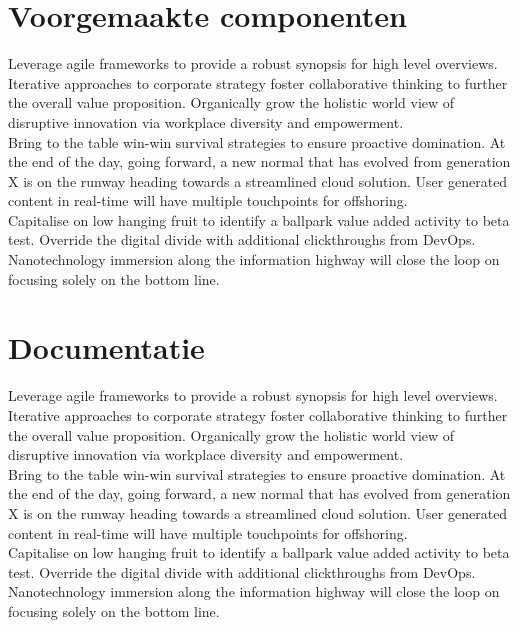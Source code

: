 \section{Voorgemaakte componenten}
Leverage agile frameworks to provide a robust synopsis for high level overviews. Iterative approaches to corporate strategy foster collaborative thinking to further the overall value proposition. Organically grow the holistic world view of disruptive innovation via workplace diversity and empowerment.\\

Bring to the table win-win survival strategies to ensure proactive domination. At the end of the day, going forward, a new normal that has evolved from generation X is on the runway heading towards a streamlined cloud solution. User generated content in real-time will have multiple touchpoints for offshoring. \\

Capitalise on low hanging fruit to identify a ballpark value added activity to beta test. Override the digital divide with additional clickthroughs from DevOps. Nanotechnology immersion along the information highway will close the loop on focusing solely on the bottom line. 

\section{Documentatie}
Leverage agile frameworks to provide a robust synopsis for high level overviews. Iterative approaches to corporate strategy foster collaborative thinking to further the overall value proposition. Organically grow the holistic world view of disruptive innovation via workplace diversity and empowerment.\\

Bring to the table win-win survival strategies to ensure proactive domination. At the end of the day, going forward, a new normal that has evolved from generation X is on the runway heading towards a streamlined cloud solution. User generated content in real-time will have multiple touchpoints for offshoring. \\

Capitalise on low hanging fruit to identify a ballpark value added activity to beta test. Override the digital divide with additional clickthroughs from DevOps. Nanotechnology immersion along the information highway will close the loop on focusing solely on the bottom line. 